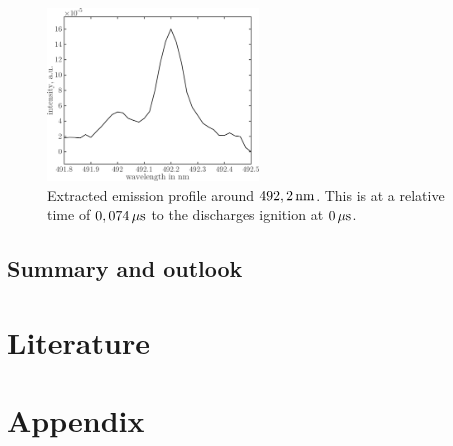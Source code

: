 \documentclass[a4paper,10pt,twoside]{article}
\begin{document}
				\begin{figure}
					\centering
					\includegraphics[width=0.5\textwidth]{figures/stark/stark_shift71in.pdf}
					\caption{Extracted emission profile around $\unit[492,2]{nm}$. This is at a relative time of $\unit[0,074]{\mu s}$ to the discharges ignition at $\unit[0]{\mu s}$.}
					\label{img:starkshift71}
				\end{figure}

		\subsection{Summary and outlook}
		
	\section{Literature}

		
		
		
	\section{Appendix}
\end{document}
